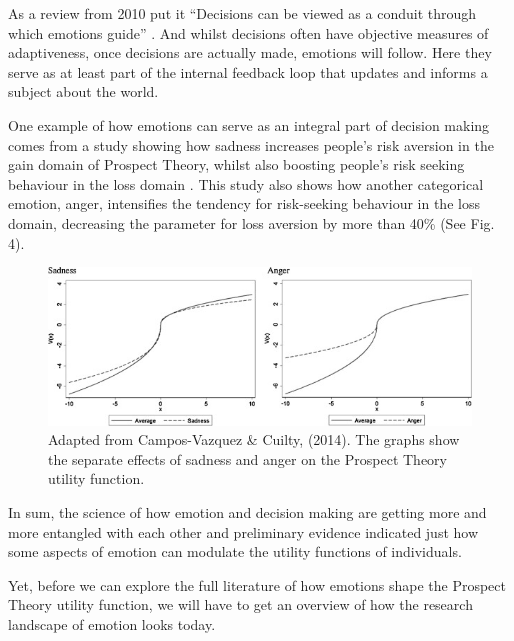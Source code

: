 \documentclass{article}
\begin{document}
As a review from 2010 put it “Decisions can be viewed as a conduit through which emotions guide” \cite{keltner2010emotion}. And whilst decisions often have objective measures of adaptiveness, once decisions are actually made, emotions will follow. Here they serve as at least part of the internal feedback loop that updates and informs a subject about the world.  
 
One example of how emotions can serve as an integral part of decision making comes from a study showing how sadness increases people’s risk aversion in the gain domain of Prospect Theory, whilst also boosting people’s risk seeking behaviour in the loss domain \cite{campos2014role}. This study also shows how another categorical emotion, anger, intensifies the tendency for risk-seeking behaviour in the loss domain, decreasing the parameter for loss aversion by more than 40\% (See Fig. 4).

\begin{figure}[H]
    \begin{centering}
    \includegraphics[width = \textwidth]{figures/Billede 5.jpg}
    \caption{Adapted from Campos-Vazquez \& Cuilty, (2014). The graphs show the separate effects of sadness and anger on the Prospect Theory utility function.}
    \end{centering}
\end{figure}

In sum, the science of how emotion and decision making are getting more and more entangled with each other and preliminary evidence indicated just how some aspects of emotion can modulate the utility functions of individuals.
 
Yet, before we can explore the full literature of how emotions shape the Prospect Theory utility function, we will have to get an overview of how the research landscape of emotion looks today.
\end{document}
